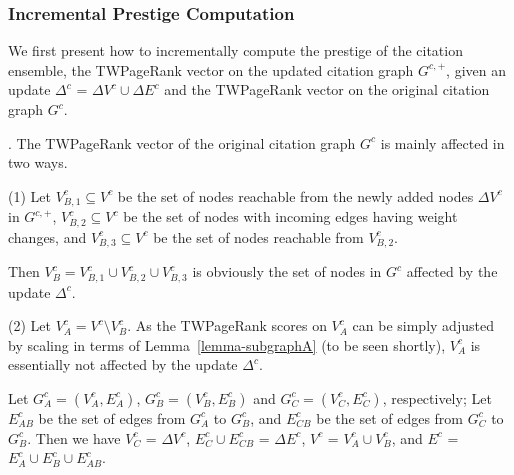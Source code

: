 {\subsubsection{Incremental Prestige Computation}

We first present how to incrementally compute the prestige of the citation ensemble, \ie the TWPageRank vector on the updated citation graph $G^{c,+}$,
given an update $\Delta^c$ = $\Delta V^c\cup\Delta E^c$ and the TWPageRank vector on the original citation graph $G^{c}$.



.
The TWPageRank vector of the original citation graph $G^{c}$ is mainly affected in two ways.



\sstab(1) Let $V^c_{B,1}\subseteq V^c$ be the set of nodes reachable from the newly added nodes $\Delta V^c$ in $G^{c,+}$, $V^c_{B,2}\subseteq V^c$ be the set of nodes with incoming edges having weight changes, and $V^c_{B,3}\subseteq V^c$ be the set of nodes reachable from  $V^c_{B,2}$.

Then $V^c_B=V^c_{B,1}\cup V^c_{B,2}\cup V^c_{B,3}$ is obviously the set of nodes in $G^{c}$ affected by the update $\Delta^c$.


\sstab(2) Let $V^c_A = V^c\setminus V^c_B$. As the TWPageRank scores on $V^c_A$ can be simply adjusted by scaling in terms of  Lemma~\ref{lemma-subgraphA} (to be seen shortly), $V^c_A$ is essentially not affected by the update $\Delta^c$. 

Let $G^c_A=(V^c_A,E^c_A)$, $G^c_B=(V^c_B,E^c_B)$ and $G^c_C=(V^c_C,E^c_C)$, respectively;
Let $E^c_{AB}$ be the set of edges from $G^c_A$ to $G^c_B$, and $E^c_{CB}$ be the set of edges from $G^c_C$ to $G^c_B$.
%
Then we have $V^c_C$ = $\Delta V^c$, $E^c_C\cup E^c_{CB}$ = $\Delta E^c$, $V^c$ = $V^c_A\cup V^c_B$, and $E^c$ = $E^c_A\cup E^c_B\cup E^c_{AB}$.

}
